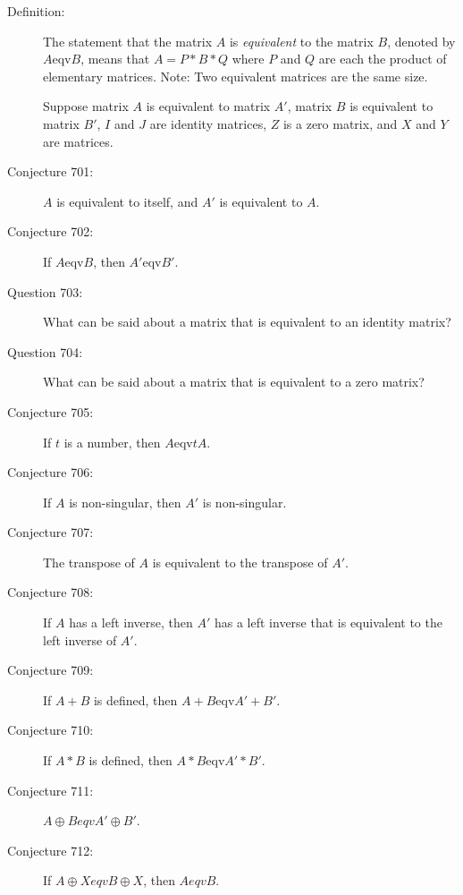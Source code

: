 \documentclass{article}
\begin{document}
\begin{description}

  \item[Definition:] The statement that the matrix $A$ is \emph{equivalent} to the matrix $B$, denoted by $A \text{eqv} B$, means that $A=P*B*Q$ where $P$ and $Q$ are each the product of elementary matrices. Note: Two equivalent matrices are the same size.

  \item[] Suppose matrix $A$ is equivalent to matrix $A'$, matrix $B$ is equivalent to matrix $B'$, $I$ and $J$ are identity matrices, $Z$ is a zero matrix, and $X$ and $Y$ are matrices.

  \item[Conjecture 701:] $A$ is equivalent to itself, and $A'$ is equivalent to $A$.

  \item[Conjecture 702:] If $A \text{eqv} B$, then $A' \text{eqv} B'$.

  \item[Question 703:] What can be said about a matrix that is equivalent to an identity matrix?

  \item[Question 704:] What can be said about a matrix that is equivalent to a zero matrix?

  \item[Conjecture 705:] If $t$ is a number, then $A \text{eqv} tA$.

  \item[Conjecture 706:] If $A$ is non-singular, then $A'$ is non-singular.

  \item[Conjecture 707:] The transpose of $A$ is equivalent to the transpose of $A'$.

  \item[Conjecture 708:] If $A$ has a left inverse, then $A'$ has a left inverse that is equivalent to the left inverse of $A'$.

  \item[Conjecture 709:] If $A+B$ is defined, then $A+B \text{eqv} A'+B'$.

  \item[Conjecture 710:] If $A*B$ is defined, then $A*B \text{eqv} A'*B'$.

  \item[Conjecture 711:] $A \oplus B eqv A' \oplus B'$.

  \item[Conjecture 712:] If $A \oplus X eqv B \oplus X$, then $A eqv B$.


\end{description}
\end{document}
